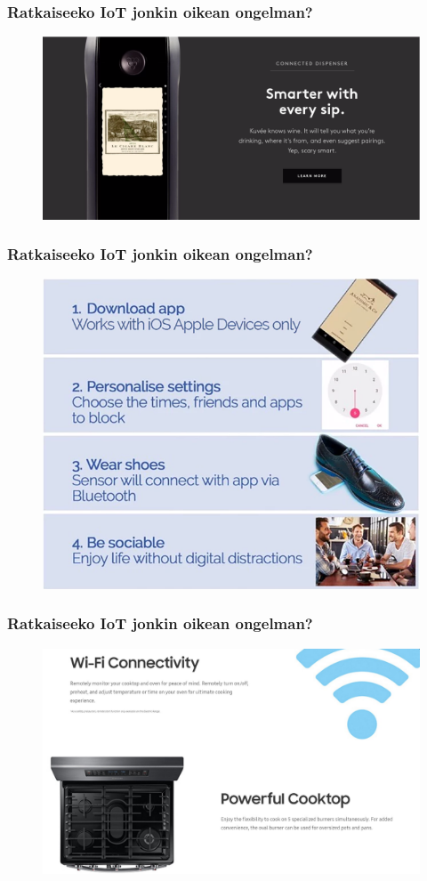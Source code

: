 \documentclass{beamer}
\begin{document}
\begin{frame}
\frametitle{Ratkaiseeko IoT jonkin oikean ongelman?}
\begin{figure}
\includegraphics[width=\linewidth]{wine-bottle}
\end{figure}
\end{frame}


\begin{frame}
\frametitle{Ratkaiseeko IoT jonkin oikean ongelman?}
\begin{figure}
\includegraphics[width=0.8\linewidth]{shoes}
\end{figure}
\end{frame}

\begin{frame}
\frametitle{Ratkaiseeko IoT jonkin oikean ongelman?}
\begin{figure}
\includegraphics[width=\linewidth]{uuni}
\end{figure}
\end{frame}
\end{document}
